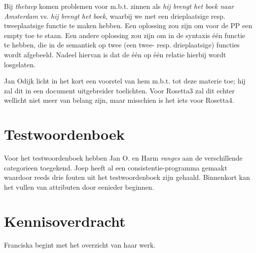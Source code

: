 Bij {\em thetavp} komen problemen voor m.b.t. zinnen als {\em hij brengt het 
boek naar Amsterdam} vs. {\em hij brengt het boek}, waarbij we met een 
drieplaatsige resp. tweeplaatsige functie te maken hebben.
Een oplossing zou zijn om voor de PP een empty toe te staan. Een andere 
oplossing zou zijn om in de syntaxis \'{e}\'{e}n functie te hebben, die in de 
semantiek op twee (een twee- resp. drieplaatsige) functies wordt afgebeeld.
Nadeel hiervan is dat de \'{e}\'{e}n op \'{e}\'{e}n relatie hierbij wordt 
losgelaten.

Jan Odijk licht in het kort een voorstel van hem m.b.t. tot deze materie toe; 
hij zal dit in een document uitgebreider toelichten. Voor Rosetta3 zal dit 
echter wellicht niet meer van belang zijn, maar misschien is het iets voor 
Rosetta4.
\section{Testwoordenboek}
Voor het testwoordenboek hebben Jan O. en Harm {\em ranges} aan de 
verschillende categorieen toegekend. Joep heeft al een consistentie-programma 
gemaakt waardoor reeds drie fouten uit het testwoordenboek zijn gehaald. 
Binnenkort kan het vullen van attributen door eenieder beginnen.
\section{Kennisoverdracht}
Franciska begint met het overzicht van haar werk.


